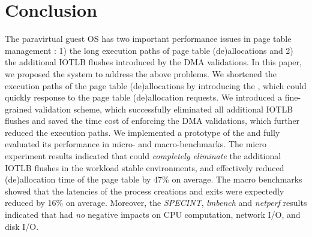 \section{Conclusion} \label{sec:con}
The paravirtual guest OS has two important performance issues in page table management : 1) the long execution paths of page table (de)allocations and 2) the additional IOTLB flushes introduced by the DMA validations.
In this paper, we proposed the \name system to address the above problems.
We shortened the execution paths of the page table (de)allocations by introducing the \cache, which could quickly response to the page table (de)allocation requests.
We introduced a fine-grained validation scheme, which successfully eliminated all additional IOTLB flushes and saved the time cost of enforcing the DMA validations, which further reduced the execution paths.
We implemented a prototype of the \name and fully evaluated its performance in micro- and macro-benchmarks.
The micro experiment results indicated that \name could \emph{completely eliminate} the additional IOTLB flushes in the workload stable environments, and effectively reduced (de)allocation time of the page table by 47\% on average.
The macro benchmarks showed that the latencies of the process creations and exits were expectedly reduced by 16\% on average.
Moreover, the \emph{SPECINT}, \emph{lmbench} and \emph{netperf} results indicated that \name had \emph{no} negative impacts on CPU computation, network I/O, and disk I/O.
